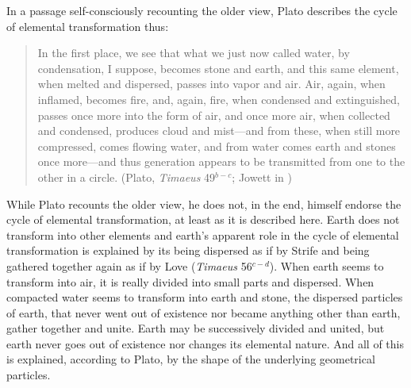 In a passage self-consciously recounting the older view, Plato describes the cycle of elemental transformation thus:
\begin{quote}
	In the first place, we see that what we just now called water, by condensation, I suppose, becomes stone and earth, and this same element, when melted and dispersed, passes into vapor and air. Air, again, when inflamed, becomes fire, and, again, fire, when condensed and extinguished, passes once more into the form of air, and once more air, when collected and condensed, produces cloud and mist---and from these, when still more compressed, comes flowing water, and from water comes earth and stones once more---and thus generation appears to be transmitted from one to the other in a circle. (Plato, \emph{Timaeus} 49\( ^{b-c} \); Jowett in \citealt[1176]{Hamilton:1989fk})
\end{quote}
While Plato recounts the older view, he does not, in the end, himself endorse the cycle of elemental transformation, at least as it is described here. Earth does not transform into other elements and earth's apparent role in the cycle of elemental transformation is explained by its being dispersed as if by Strife and being gathered together again as if by Love (\emph{Timaeus} 56\( ^{c-d} \)). When earth seems to transform into air, it is really divided into small parts and dispersed. When compacted water seems to transform into earth and stone, the dispersed particles of earth, that never went out of existence nor became anything other than earth, gather together and unite. Earth may be successively divided and united, but earth never goes out of existence nor changes its elemental nature. And all of this is explained, according to Plato, by the shape of the underlying geometrical particles.

